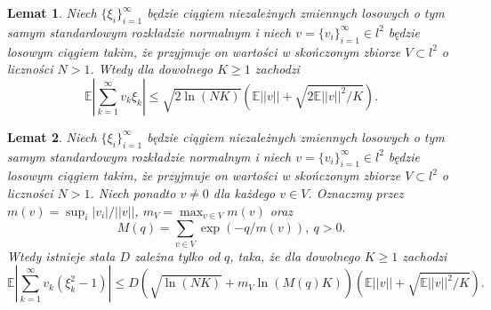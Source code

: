 \documentclass[man,mfiu]{mgrwms}
\newtheorem{lm}{Lemat}[chapter]
\begin{document}
\begin{lm}\label{lem1}
Niech $\{\xi_i\}_{i=1}^{\infty}$ będzie ciągiem niezależnych zmiennych losowych o tym samym standardowym rozkładzie normalnym i niech $v=\{v_i\}_{i=1}^{\infty}\in l^2$ będzie losowym ciągiem takim, że przyjmuje on wartości w skończonym zbiorze $V\subset l^2$ o liczności $N>1$. Wtedy dla dowolnego $K\geq 1$ zachodzi
\begin{displaymath}
\mathbb{E}\left|\sum_{k=1}^{\infty}v_k\xi_k\right|\leq \sqrt{2\ln (NK)}\left(\mathbb{E}||v||+\sqrt{2\mathbb{E}||v||^2/K}\right).
\end{displaymath}
\end{lm}

\begin{lm}\label{lem2}
Niech $\{\xi_i\}_{i=1}^{\infty}$ będzie ciągiem niezależnych zmiennych losowych o tym samym standardowym rozkładzie normalnym i niech $v=\{v_i\}_{i=1}^{\infty}\in l^2$ będzie losowym ciągiem takim, że przyjmuje on wartości w skończonym zbiorze $V\subset l^2$ o liczności $N>1$. Niech ponadto $v\neq 0$ dla każdego $v\in V$. Oznaczmy przez $m(v)=\sup_i |v_i|/||v||$, $m_V=\max_{v\in V}m(v)$ oraz 
\begin{displaymath}
M(q)=\sum_{v\in V}\exp (-q/m(v)),\ q>0.
\end{displaymath}
Wtedy istnieje stała $D$ zależna tylko od $q$, taka, że dla dowolnego $K\geq 1$ zachodzi
\begin{displaymath}
\mathbb{E}\left|\sum_{k=1}^{\infty}v_k(\xi_k^2-1)\right|\leq D\left(\sqrt{\ln (NK)}+m_V\ln (M(q)K)\right)\left(\mathbb{E}||v||+\sqrt{\mathbb{E}||v||^2/K}\right).
\end{displaymath}
\end{lm}
\end{document}

